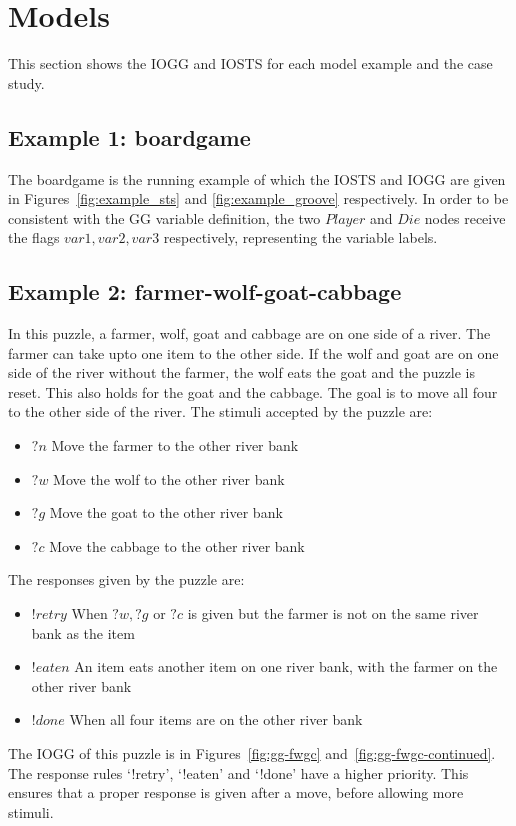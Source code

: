 \section{Models}\label{sec:model-examples}
This section shows the IOGG and IOSTS for each model example and the case study. 

\subsection{Example 1: boardgame}
The boardgame is the running example of which the IOSTS and IOGG are given in Figures~\ref{fig:example_sts} and \ref{fig:example_groove} respectively. In order to be consistent with the GG variable definition, the two $Player$ and $Die$ nodes receive the flags $\mathit{var1, var2, var3}$ respectively, representing the variable labels.

\subsection{Example 2: farmer-wolf-goat-cabbage}
In this puzzle, a farmer, wolf, goat and cabbage are on one side of a river. The farmer can take upto one item to the other side. If the wolf and goat are on one side of the river without the farmer, the wolf eats the goat and the puzzle is reset. This also holds for the goat and the cabbage. The goal is to move all four to the other side of the river. The stimuli accepted by the puzzle are:
\begin{itemize}
\item $?n$ Move the farmer to the other river bank
\item $?w$ Move the wolf to the other river bank
\item $?g$ Move the goat to the other river bank
\item $?c$ Move the cabbage to the other river bank
\end{itemize}
The responses given by the puzzle are:
\begin{itemize}
\item $!retry$ When $?w, ?g$ or $?c$ is given but the farmer is not on the same river bank as the item
\item $!eaten$ An item eats another item on one river bank, with the farmer on the other river bank 
\item $!done$ When all four items are on the other river bank
\end{itemize}

The IOGG of this puzzle is in Figures~\ref{fig:gg-fwgc} and~\ref{fig:gg-fwgc-continued}. The response rules `!retry', `!eaten' and `!done' have a higher priority. This ensures that a proper response is given after a move, before allowing more stimuli.

